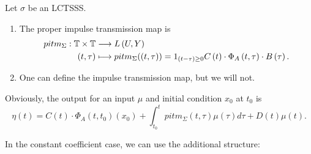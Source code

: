 \begin{definition}
	Let $\sigma$ be an LCTSSS. 
	\begin{enumerate}
		\item The proper impulse transmission map is 
			\begin{align*}
				pitm_\Sigma: \mathbb{T} \times \mathbb{T}  &\longrightarrow L\left( U, Y \right)  \\
				\left( t, \tau \right)  &\longmapsto pitm_\Sigma(\left( t, \tau \right) ) = 1_{ \left( t - \tau \right)\ge 0}C\left( t \right) \cdot \Phi_A \left( t, \tau \right) \cdot B\left( \tau \right) 
			.\end{align*}
		\item One can define the impulse transmission map, but we will not.
	\end{enumerate}
	Obviously, the output for an input $\mu$ and initial condition $x_0 $ at $t_0$ is 
	\[
		\eta\left( t \right) = C\left( t \right) \cdot \Phi_A \left( t, t_0 \right) \left( x_0 \right)  + \int_{t_0}^{t} pitm _{\Sigma}\left( t, \tau \right) \mu\left( \tau \right) d \tau + D\left( t \right) \mu\left( t \right)  
	.\] 
\end{definition}
In the constant coefficient case, we can use the additional structure: 

